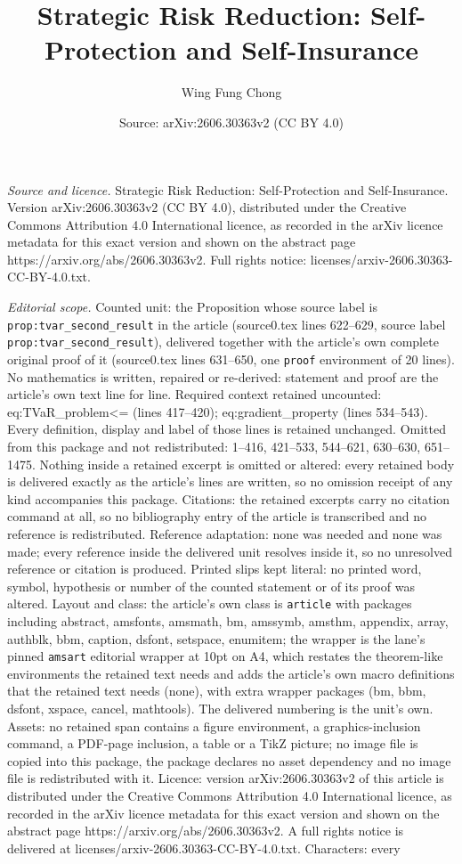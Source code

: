 \documentclass[10pt,a4paper]{amsart}
\title[Strategic Risk Reduction: Self-Protection and Self-Insurance]{Strategic Risk Reduction: Self-Protection and Self-Insurance}
\author{Wing Fung Chong}
\date{Source: arXiv:2606.30363v2 (CC BY 4.0)}
\begin{document}
\maketitle

\noindent\emph{Source and licence.} Strategic Risk Reduction: Self-Protection and Self-Insurance. Version arXiv:2606.30363v2 (CC BY 4.0), distributed under the Creative Commons Attribution 4.0 International licence, as recorded in the arXiv licence metadata for this exact version and shown on the abstract page https://arxiv.org/abs/2606.30363v2. Full rights notice: licenses/arxiv-2606.30363-CC-BY-4.0.txt.\par\smallskip

\noindent\textit{Editorial scope.} Counted unit: the Proposition whose source label is \texttt{prop:tvar\_second\_result} in the article (source0.tex lines 622--629, source label \texttt{prop:tvar\_second\_result}), delivered together with the article's own complete original proof of it (source0.tex lines 631--650, one \texttt{proof} environment of 20 lines). No mathematics is written, repaired or re-derived: statement and proof are the article's own text line for line. Required context retained uncounted: eq:TVaR\_problem<= (lines 417--420); eq:gradient\_property (lines 534--543). Every definition, display and label of those lines is retained unchanged. Omitted from this package and not redistributed: 1--416, 421--533, 544--621, 630--630, 651--1475. Nothing inside a retained excerpt is omitted or altered: every retained body is delivered exactly as the article's lines are written, so no omission receipt of any kind accompanies this package. Citations: the retained excerpts carry no citation command at all, so no bibliography entry of the article is transcribed and no reference is redistributed. Reference adaptation: none was needed and none was made; every reference inside the delivered unit resolves inside it, so no unresolved reference or citation is produced. Printed slips kept literal: no printed word, symbol, hypothesis or number of the counted statement or of its proof was altered. Layout and class: the article's own class is \texttt{article} with packages including abstract, amsfonts, amsmath, bm, amssymb, amsthm, appendix, array, authblk, bbm, caption, dsfont, setspace, enumitem; the wrapper is the lane's pinned \texttt{amsart} editorial wrapper at 10pt on A4, which restates the theorem-like environments the retained text needs and adds the article's own macro definitions that the retained text needs (none), with extra wrapper packages (bm, bbm, dsfont, xspace, cancel, mathtools). The delivered numbering is the unit's own. Assets: no retained span contains a figure environment, a graphics-inclusion command, a PDF-page inclusion, a table or a TikZ picture; no image file is copied into this package, the package declares no asset dependency and no image file is redistributed with it. Licence: version arXiv:2606.30363v2 of this article is distributed under the Creative Commons Attribution 4.0 International licence, as recorded in the arXiv licence metadata for this exact version and shown on the abstract page https://arxiv.org/abs/2606.30363v2. A full rights notice is delivered at licenses/arxiv-2606.30363-CC-BY-4.0.txt. Characters: every 
\end{document}
